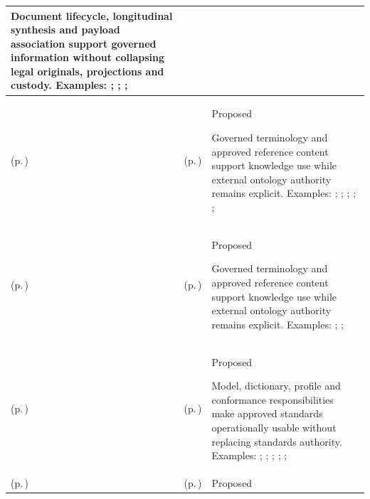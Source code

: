 \begin{longtable}{|>{\raggedright\arraybackslash}p{0.27\TableWidth}|>{\raggedright\arraybackslash}p{0.27\TableWidth}|>{\raggedright\arraybackslash}p{0.46\TableWidth}|}
Document lifecycle, longitudinal synthesis and payload association support governed information without collapsing legal originals, projections and custody. Examples: \nameref{feature:binary-content-resolution-assembly}; \nameref{function:resolve-associated-binary-content}; \nameref{function:assemble-associated-binary-content}; \nameref{service:associated-binary-content-retrieval}\\\hline
\nameref{cap:bc-clinical-knowledge-management} (p.\,\pageref{cap:bc-clinical-knowledge-management}) & \nameref{cap:bec-clinical-knowledge-services} (p.\,\pageref{cap:bec-clinical-knowledge-services}) & Proposed

Governed terminology and approved reference content support knowledge use while external ontology authority remains explicit. Examples: \nameref{feature:feat-ise-14}; \nameref{feature:feat-ise-15}; \nameref{function:resolve-clinical-concept}; \nameref{service:terminology-concept-resolution-service}; \nameref{function:map-clinical-concept}; \nameref{service:terminology-mapping-service}\\\hline
\nameref{cap:bc-clinical-knowledge-management} (p.\,\pageref{cap:bc-clinical-knowledge-management}) & \nameref{cap:bec-governed-reference-dataset-administration} (p.\,\pageref{cap:bec-governed-reference-dataset-administration}) & Proposed

Governed terminology and approved reference content support knowledge use while external ontology authority remains explicit. Examples: \nameref{feature:governed-dataset-content-revision}; \nameref{function:accept-governed-dataset-revision}; \nameref{service:governed-reference-dataset-content-query}\\\hline
\nameref{cap:bc-health-information-standards-governance} (p.\,\pageref{cap:bc-health-information-standards-governance}) & \nameref{cap:bec-information-design-governance} (p.\,\pageref{cap:bec-information-design-governance}) & Proposed

Model, dictionary, profile and conformance responsibilities make approved standards operationally usable without replacing standards authority. Examples: \nameref{feature:feat-ise-27}; \nameref{feature:feat-ise-28}; \nameref{function:govern-information-semantics}; \nameref{service:semantic-model-definition-service}; \nameref{function:govern-information-definition}; \nameref{service:information-dictionary-query}\\\hline
\nameref{cap:bc-clinical-semantics-governance} (p.\,\pageref{cap:bc-clinical-semantics-governance}) & \nameref{cap:bec-information-design-governance} (p.\,\pageref{cap:bec-information-design-governance}) & Proposed


\end{longtable}
